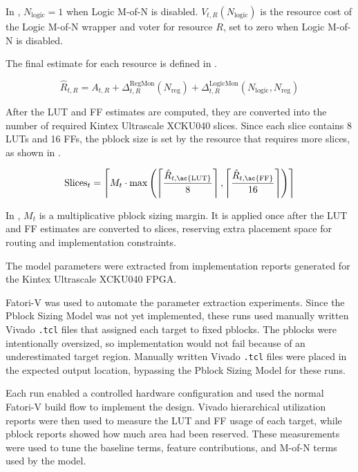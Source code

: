 In , \(N_{\text{logic}}=1\) when Logic M-of-N is disabled. \(V_{t,R}(N_{\text{logic}})\) is the resource cost of the Logic M-of-N wrapper and voter for resource \(R\), set to zero when Logic M-of-N is disabled.

The final estimate for each resource is defined in .

\begin{equation}
\hat{R}_{t,R}
=
A_{t,R}
+
\Delta^{\text{RegMon}}_{t,R}(N_{\text{reg}})
+
\Delta^{\text{LogicMon}}_{t,R}(N_{\text{logic}},N_{\text{reg}})
\label{eq:pblock_resource_model}
\end{equation}

After the \ac{LUT} and \ac{FF} estimates are computed, they are converted into the number of required Kintex Ultrascale XCKU040 \cite{xcku040} slices. Since each slice contains 8 \acp{LUT} and 16 \acp{FF}, the pblock size is set by the resource that requires more slices, as shown in .

\begin{equation}
\text{Slices}_{t}
=
\left\lceil
M_t
\cdot
\max
\left(
\left\lceil \frac{\hat{R}_{t,\text{\ac{LUT}}}}{8} \right\rceil,
\left\lceil \frac{\hat{R}_{t,\text{\ac{FF}}}}{16} \right\rceil
\right)
\right\rceil
\label{eq:pblock_slice_binding}
\end{equation}

In , \(M_t\) is a multiplicative pblock sizing margin. It is applied once after the \ac{LUT} and \ac{FF} estimates are converted to slices, reserving extra placement space for routing and implementation constraints.

The model parameters were extracted from implementation reports generated for the Kintex Ultrascale XCKU040 \cite{xcku040} \ac{FPGA}. 


\ac{Fatori-V} was used to automate the parameter extraction experiments. Since the Pblock Sizing Model was not yet implemented, these runs used manually written Vivado \texttt{.tcl} files that assigned each target to fixed pblocks. The pblocks were intentionally oversized, so implementation would not fail because of an underestimated target region. Manually written Vivado \texttt{.tcl} files were placed in the expected output location, bypassing the Pblock Sizing Model for these runs.

Each run enabled a controlled hardware configuration and used the normal \ac{Fatori-V} build flow to implement the design. Vivado hierarchical utilization reports were then used to measure the \ac{LUT} and \ac{FF} usage of each target, while pblock reports showed how much area had been reserved. These measurements were used to tune the baseline terms, feature contributions, and M-of-N terms used by the model.

